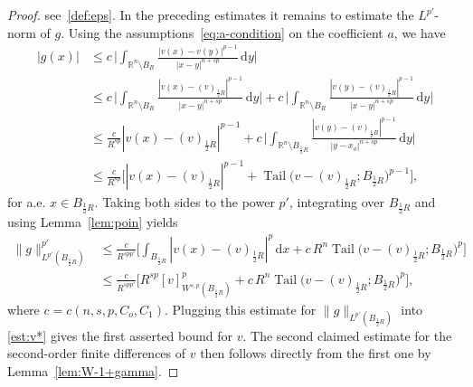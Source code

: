 \documentclass[10pt,letterpaper]{amsart}
\theoremstyle{definition}
\numberwithin{theorem}{section}
\numberwithin{equation}{section}
\newcommand{\R}{\ensuremath{\mathbb{R}}}
\newcommand{\1}{\ensuremath{\mathds{1}}}
\newcommand{\dx}{\mathrm{d}x}
\newcommand{\dy}{\mathrm{d}y}
\DeclareMathOperator{\Tail}{Tail}
\numberwithin{equation}{section}
\begin{document}
\begin{proof}
see~\eqref{def:eps}. 
In the preceding estimates it remains to estimate the $L^{p'}$-norm of $g$.
Using the assumptions~\eqref{eq:a-condition} on the coefficient $a$, we have 
\begin{align}\label{est-f}
    |g(x)|
    &\le 
    c\, \bigg|\int_{\R^n\setminus B_{R}} \frac{|v(x)-v(y)|^{p-1}}{|x-y|^{n+sp}}\,\dy \bigg| \nonumber\\
    &\le 
    c\, \bigg|\int_{\R^n\setminus B_{R}} \frac{|v(x)-(v)_{\frac12 R}|^{p-1}}{|x-y|^{n+sp}}\,\dy \bigg| +
    c\, \bigg|\int_{\R^n\setminus B_{R}} \frac{|v(y)-(v)_{\frac12 R}|^{p-1}}{|x-y|^{n+sp}}\,\dy \bigg|  \nonumber\\
    &\le 
    \frac{c}{R^{sp}} |v(x)-(v)_{\frac12 R}|^{p-1} +
    c\, \bigg|\int_{\R^n\setminus B_{\frac12 R}} \frac{|v(y)-(v)_{\frac12 R}|^{p-1}}{|y-x_o|^{n+sp}}\,\dy \bigg|  \nonumber\\
    &\le 
    \frac{c}{R^{sp}} \Big[ |v(x)-(v)_{\frac12 R}|^{p-1} +
    \Tail\big(v-(v)_{\frac12 R};B_{\frac12 R}\big)^{p-1}\Big]  ,
\end{align}
for a.e. $x\in B_{\frac12 R}$.
Taking both sides to the power $p'$, integrating over $B_{\frac12 R}$ and using Lemma~\ref{lem:poin} yields
\begin{align*}
    \|g\|_{L^{p'}(B_{\frac12 R})}^{p'}
    &\le 
    \frac{c}{R^{spp'}}\bigg[ \int_{B_{\frac12 R}} |v(x)-(v)_{\frac12 R}|^{p} \,\dx +
    c\,R^n \Tail\big(v-(v)_{\frac12 R};B_{\frac12 R}\big)^p \bigg]\\
    &\le 
    \frac{c}{R^{spp'}} \Big[ R^{sp}[v]_{W^{s,p}(B_{\frac12R})}^p +
    c\,R^n \Tail\big(v-(v)_{\frac12 R};B_{\frac12 R}\big)^p\Big] ,
\end{align*}
where  $c=c(n,s,p,C_o,C_1)$. 
Plugging this estimate for $\|g\|_{L^{p'}(B_{\frac12 R})}$ into \eqref{est:v*} gives the first asserted bound for $v$.
The second claimed estimate for the second-order finite differences of $v$ then follows directly from the first one by Lemma~\ref{lem:W-1+gamma}.


\end{proof}
\end{document}
